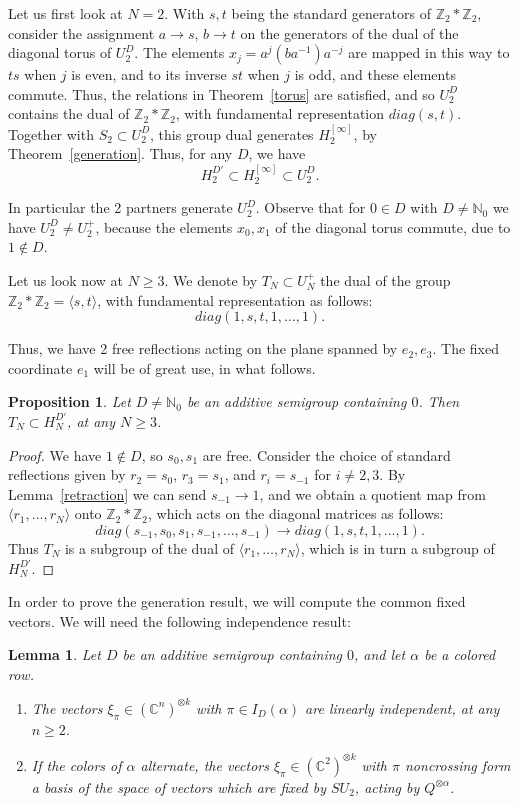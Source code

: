 \documentclass[11pt,a4paper]{article}
\newtheorem{prop}[thm]{Proposition}
\newtheorem{lem}[thm]{Lemma}
\begin{document}
Let us first look at $N=2$. With $s,t$ being the standard generators of $\mathbb Z_2*\mathbb Z_2$, consider the assignment $a\to s$, $b\to t$ on the generators of the dual of the diagonal torus of $U_2^D$. The elements $x_j=a^j(ba^{-1})a^{-j}$ are mapped in this way to $ts$ when $j$ is even, and to its inverse $st$ when $j$ is odd, and these elements commute. Thus, the relations in Theorem~\ref{torus} are satisfied, and so $U_2^D$ contains the dual of $\mathbb Z_2*\mathbb Z_2$, with fundamental representation $diag(s,t)$. Together with $S_2\subset U_2^D$, this group dual generates $H_2^{[\infty]}$, by Theorem~\ref{generation}. Thus, for any $D$, we have
\[
 H_2^{D'}\subset H_2^{[\infty]}\subset U_2^D.
\]

In particular the 2 partners generate $U_2^D$. Observe that for $0\in D$ with $D\neq\mathbb N_0$ we have $U_2^D\neq U_2^+$, because the elements $x_0,x_1$ of the diagonal torus commute, due to $1\notin D$.

Let us look now at $N\geq3$. We denote by $T_N\subset U_N^+$ the dual of the group $\mathbb Z_2*\mathbb Z_2=\langle s,t\rangle$, with fundamental representation as follows:
\[
 diag(1,s,t,1,\ldots,1).
\]

Thus, we have 2 free reflections acting on the plane spanned by $e_2,e_3$. The fixed coordinate $e_1$ will be of great use, in what follows.

\begin{prop}\label{plane-subgroup}
Let $D\neq\mathbb N_0$ be an additive semigroup containing $0$. Then $T_N\subset H_N^{D'}$, at any $N\geq3$.
\end{prop}

\begin{proof}
We have $1\notin D$, so $s_0,s_1$ are free. Consider the choice of standard reflections given by $r_2=s_0$, $r_3=s_1$, and $r_i=s_{-1}$ for $i\neq2,3$. By Lemma~\ref{retraction} we can send $s_{-1}\to1$, and we obtain a quotient map from $\langle r_1,\ldots,r_N\rangle$ onto $\mathbb Z_2*\mathbb Z_2$, which acts on the diagonal matrices as follows:
\[
 diag(s_{-1},s_0,s_1,s_{-1},\ldots,s_{-1})\to diag(1,s,t,1,\ldots,1).
\]
 Thus $T_N$ is a subgroup of the dual of $\langle r_1,\ldots,r_N\rangle$, which is in turn a subgroup of $H_N^{D'}$.
\end{proof}

In order to prove the generation result, we will compute the common fixed vectors. We will need the following independence result:

\begin{lem}\label{height-basis}
Let $D$ be an additive semigroup containing $0$, and let $\alpha$ be a colored row.
\begin{enumerate}
\item The vectors $\xi_\pi\in(\mathbb C^n)^{\otimes k}$ with $\pi\in I_D(\alpha)$ are linearly independent, at any $n\geq2$.

\item If the colors of $\alpha$ alternate, the vectors $\xi_\pi\in(\mathbb C^2)^{\otimes k}$ with $\pi$ noncrossing form a basis of the space of vectors which are fixed by $SU_2$, acting by $Q^{\otimes\alpha}$.
\end{enumerate}
\end{lem}
\end{document}
